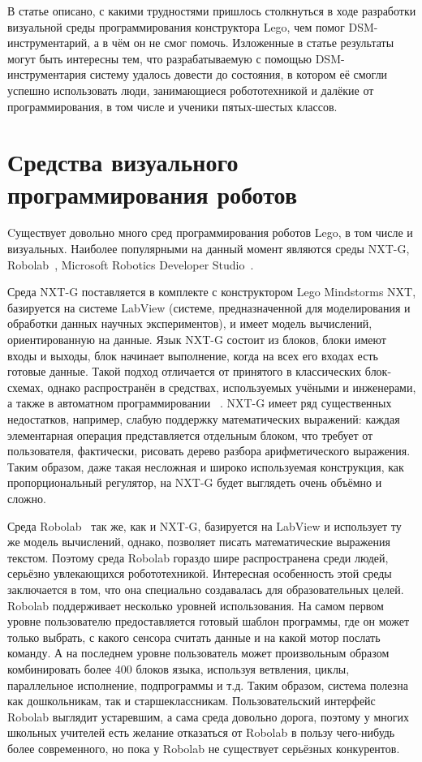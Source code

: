 \documentclass[a4paper]{article}
\begin{document}
В статье описано, с какими трудностями пришлось столкнуться в ходе разработки визуальной среды программирования конструктора Lego, чем помог DSM-инструментарий, а в чём он не смог помочь. Изложенные в статье результаты могут быть интересны тем, что разрабатываемую с помощью DSM-инструментария систему удалось довести до состояния, в котором её смогли успешно использовать люди, занимающиеся робототехникой и далёкие от программирования, в том числе и ученики пятых-шестых классов. 

\section{Средства визуального программирования роботов}
Cуществует довольно много сред программирования роботов Lego, в том числе и визуальных. Наиболее популярными на данный момент являются среды NXT-G, Robolab~\cite{robolab}, Microsoft Robotics Developer Studio~\cite{mrds}.

Среда NXT-G поставляется в комплекте с конструктором Lego Mindstorms NXT, базируется на системе LabView (системе, предназначенной для моделирования и обработки данных научных экспериментов), и имеет модель вычислений, ориентированную на данные. Язык NXT-G  состоит из блоков, блоки имеют входы и выходы, блок начинает выполнение, когда на всех его входах есть готовые данные. Такой подход отличается от принятого в классических блок-схемах, однако распространён в средствах, используемых учёными и инженерами, а также в автоматном программировании ~\cite{Sh1,Sh2}.  NXT-G имеет ряд существенных недостатков, например, слабую поддержку математических выражений: каждая элементарная операция представляется отдельным блоком, что требует от пользователя, фактически, рисовать дерево разбора арифметического выражения. Таким образом, даже такая несложная и широко используемая конструкция, как пропорциональный регулятор, на NXT-G будет выглядеть очень объёмно и сложно.

Среда Robolab~\cite{robolab} так же, как и NXT-G, базируется на LabView и использует ту же модель вычислений, однако, позволяет писать математические выражения текстом. Поэтому среда Robolab гораздо шире распространена среди людей, серьёзно увлекающихся робототехникой. Интересная особенность этой среды заключается в том, что она специально создавалась для образовательных целей. Robolab  поддерживает несколько уровней использования. На самом первом уровне пользователю предоставляется готовый шаблон программы, где он может только выбрать, с какого сенсора считать данные и на какой мотор послать команду. А на последнем уровне пользователь может произвольным образом комбинировать более 400 блоков языка, используя ветвления, циклы, параллельное исполнение, подпрограммы и т.д. Таким образом, система полезна как дошкольникам, так и старшеклассникам. Пользовательский интерфейс Robolab выглядит устаревшим, а сама среда довольно дорога, поэтому у многих школьных учителей есть желание отказаться от Robolab в пользу чего-нибудь более современного, но пока у Robolab не существует серьёзных конкурентов.
\end{document}
